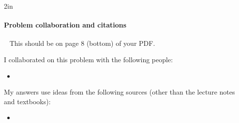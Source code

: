 
\vfill

\begin{answerBox}{2in}          %
  
  \paragraph{Problem  collaboration and citations}~\GradescopeComment
  {This should be on page 8 (bottom) of your PDF.}

  I collaborated on this problem with the following people:
  \begin{blue}
    \begin{itemize}
    \item \REPLACEME                    %
    \end{itemize}
  \end{blue}

  My answers use ideas from the following sources (other than the lecture notes and textbooks): 
  \begin{blue}
    \begin{itemize}
    \item \REPLACEME                    %
    \end{itemize}
  \end{blue}

\end{answerBox}



